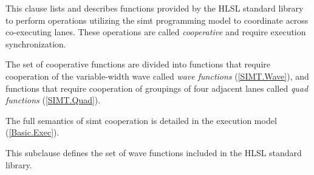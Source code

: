 
\p This clause lists and describes functions provided by the HLSL standard
library to perform operations utilizing the \acrshort{simt} programming model to
coordinate across co-executing \gls{lane}s. These operations are called
\textit{cooperative} and require execution synchronization.

\p The set of cooperative functions are divided into functions that require
cooperation of the variable-width \gls{wave} called \textit{wave functions}
(\ref{SIMT.Wave}), and functions that require cooperation of groupings of four
adjacent \gls{lane}s called \textit{quad functions} (\ref{SIMT.Quad}).

\p The full semantics of \acrshort{simt} cooperation is detailed in the
execution model (\ref{Basic.Exec}).


\p This subclause defines the set of \gls{wave} functions included in the
HLSL standard library.


